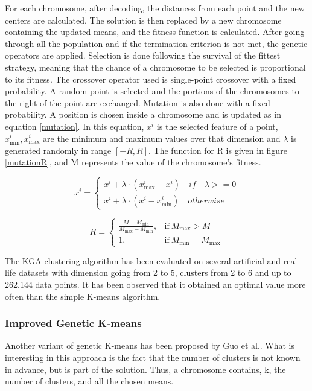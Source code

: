 \documentclass[12pt]{article}
\begin{document}
	For each chromosome, after decoding, the distances from each point and the new centers are calculated. The solution is then replaced by a new chromosome containing the updated means, and the fitness function is calculated. After going through all the population and if the termination criterion is not met, the genetic operators are applied. Selection is done following the survival of the fittest strategy, meaning that the chance of a chromosome to be selected is proportional to its fitness. The crossover operator used is single-point crossover with a fixed probability. A random point is selected and the portions of the chromosomes to the right of the point are exchanged. Mutation is also done with a fixed probability. A position is chosen inside a chromosome and is updated as in equation \ref{mutation}. In this equation, \(x^i\) is the selected feature of a point, \(x_\mathrm{min}^i, x_\mathrm{max}^i\) are the minimum and maximum values over that dimension and $\lambda$ is generated randomly in range \([-R,R]\). The function for R is given in figure \ref{mutationR}, and M represents the value of the chromosome's fitness.
	
	\begin{equation}
		\label{mutation}
		x^i = 
		\begin{cases}
			x^i + \lambda \cdot (x_\mathrm{max}^i - x^i) \quad if \quad \lambda >= 0 \\
			x^i + \lambda \cdot (x^i - x_\mathrm{min}^i) \quad otherwise
		\end{cases} 
	\end{equation}
	
	\begin{equation}
	\label{mutationR}
		R =
			\begin{cases}
			\frac{M - M_\mathrm{min}}{M_\mathrm{max} - M_\mathrm{min}}, & \text{if}\ M_\mathrm{max} > M \\
			1, & \text{if}\ M_\mathrm{min} = M_\mathrm{max}
			\end{cases}
	\end{equation}
	
	The KGA-clustering algorithm has been evaluated on several artificial and real life datasets with dimension going from 2 to 5, clusters from 2 to 6 and up to 262.144 data points. It has been observed that it obtained an optimal value more often than the simple K-means algorithm.
	
	\subsubsection{Improved Genetic K-means}
	Another variant of genetic K-means has been proposed by Guo et al.\cite{ImprovedGeneticKmeans}. What is interesting in this approach is the fact that the number of clusters is not known in advance, but is part of the solution. Thus, a chromosome contains, k, the number of clusters, and all the chosen means.
	
\end{document}

